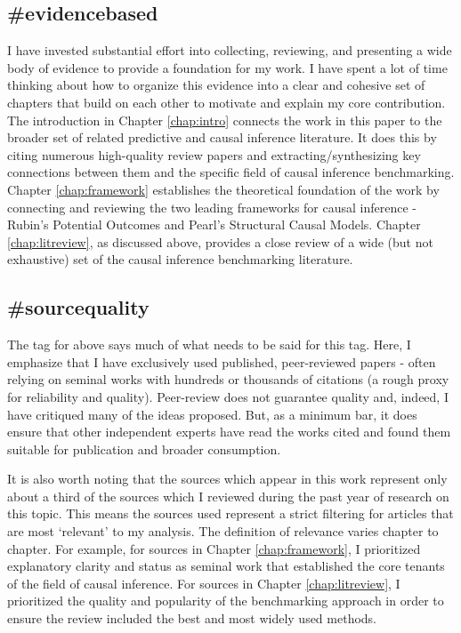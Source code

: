 \documentclass[./main.tex]{subfiles}
\begin{document}

\subsection*{\textbf{\#evidencebased}}
\label{hc:evidencebased}

I have invested substantial effort into collecting, reviewing, and presenting a wide body of evidence to provide a foundation for my work. I have spent a lot of time thinking about how to organize this evidence into a clear and cohesive set of chapters that build on each other to motivate and explain my core contribution. The introduction in Chapter \ref{chap:intro} connects the work in this paper to the broader set of related predictive and causal inference literature. It does this by citing numerous high-quality review papers and extracting/synthesizing key connections between them and the specific field of causal inference benchmarking. Chapter \ref{chap:framework} establishes the theoretical foundation of the work by connecting and reviewing the two leading frameworks for causal inference - Rubin's Potential Outcomes and Pearl's Structural Causal Models. Chapter \ref{chap:litreview}, as discussed above, provides a close review of a wide (but not exhaustive) set of the causal inference benchmarking literature.


\subsection*{\textbf{\#sourcequality}}
\label{hc:sourcequality}

The tag for  above says much of what needs to be said for this tag. Here, I emphasize that I have exclusively used published, peer-reviewed papers - often relying on seminal works with hundreds or thousands of citations (a rough proxy for reliability and quality). Peer-review does not guarantee quality and, indeed, I have critiqued many of the ideas proposed. But, as a minimum bar, it does ensure that other independent experts have read the works cited and found them suitable for publication and broader consumption.

\vspace{\baselineskip}

It is also worth noting that the sources which appear in this work represent only about a third of the sources which I reviewed during the past year of research on this topic. This means the sources used represent a strict filtering for articles that are most `relevant' to my analysis. The definition of relevance varies chapter to chapter. For example, for sources in Chapter \ref{chap:framework}, I prioritized explanatory clarity and status as seminal work that established the core tenants of the field of causal inference. For sources in Chapter \ref{chap:litreview}, I prioritized the quality and popularity of the benchmarking approach in order to ensure the review included the best and most widely used methods.
\end{document}

